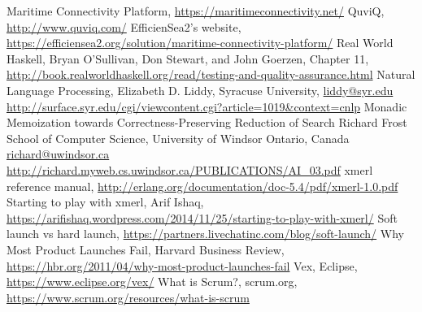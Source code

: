 \begin{thebibliography}{9}
		Maritime Connectivity Platform,
		\url{https://maritimeconnectivity.net/}
		QuviQ,
		\url{http://www.quviq.com/}
		EfficienSea2's website,
		\url{https://efficiensea2.org/solution/maritime-connectivity-platform/}
		Real World Haskell,
		Bryan O'Sullivan, Don Stewart, and John Goerzen,
		Chapter 11,
		\url{http://book.realworldhaskell.org/read/testing-and-quality-assurance.html}
		Natural Language Processing,
		Elizabeth D. Liddy,
		Syracuse University,
		\url{liddy@syr.edu}
		\url{http://surface.syr.edu/cgi/viewcontent.cgi?article=1019&context=cnlp}
		Monadic Memoization towards Correctness-Preserving Reduction of Search
		Richard Frost
		School of Computer Science, University of Windsor
		Ontario, Canada
		\url{richard@uwindsor.ca}
		\url{http://richard.myweb.cs.uwindsor.ca/PUBLICATIONS/AI_03.pdf}
		xmerl reference manual,
		\url{http://erlang.org/documentation/doc-5.4/pdf/xmerl-1.0.pdf}
		Starting to play with xmerl,
		Arif Ishaq,
		\url{https://arifishaq.wordpress.com/2014/11/25/starting-to-play-with-xmerl/}
		Soft launch vs hard launch,
		\url{https://partners.livechatinc.com/blog/soft-launch/}
		Why Most Product Launches Fail,
		Harvard Business Review,
		\url{https://hbr.org/2011/04/why-most-product-launches-fail}
		Vex,
		Eclipse,
		\url{https://www.eclipse.org/vex/}
		What is Scrum?,
		scrum.org,
		\url{https://www.scrum.org/resources/what-is-scrum}
\end{thebibliography}